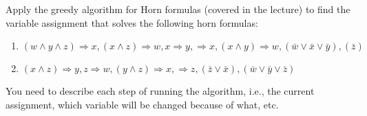 \documentclass[11pt]{article}
\begin{document}
\begin{qunlist}
Apply the greedy algorithm for Horn formulas (covered in the lecture) to find the variable assignment that solves the following horn formulas:
\begin{enumerate}
\item $(w \land y \land z) \Rightarrow x, (x \land z) \Rightarrow w, x \Rightarrow y, \Rightarrow x, (x \land y) \Rightarrow w, (\bar{w} \lor \bar{x} \lor \bar{y}), (\bar{z})$  


\item $(x \land z) \Rightarrow y, z \Rightarrow w, (y \land z) \Rightarrow x, \Rightarrow z, (\bar{z} \lor \bar{x}), (\bar{w} \lor \bar{y} \lor \bar{z})$

\end{enumerate}

You need to describe each step of running the algorithm, i.e., the current assignment, which variable will be changed because of what, etc.



\end{qunlist}
\end{document}
